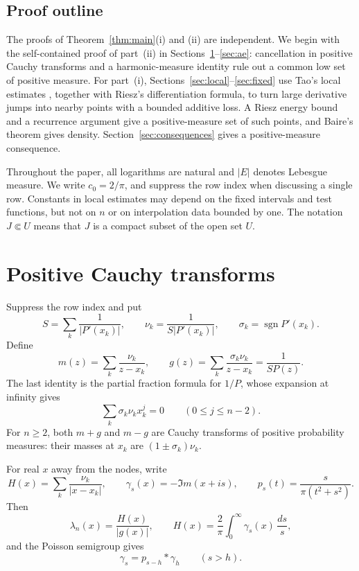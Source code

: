 \documentclass[11pt]{article}
\theoremstyle{remark}
\numberwithin{equation}{section}
\begin{document}
\subsection{Proof outline}

The proofs of Theorem~\ref{thm:main}(i) and (ii) are independent.
We begin with the self-contained proof of part~(ii) in
Sections~\ref{sec:cauchy}--\ref{sec:ae}: cancellation in positive
Cauchy transforms and a harmonic-measure identity rule out a common
low set of positive measure.
For part~(i), Sections~\ref{sec:local}--\ref{sec:fixed} use Tao's local
estimates \cite[Theorem~4.1(ii)]{Tao}, together with Riesz's
differentiation formula, to turn large derivative jumps into nearby
points with a bounded additive loss.
A Riesz energy bound and a recurrence argument give a positive-measure
set of such points, and Baire's theorem gives density.
Section~\ref{sec:consequences} gives a positive-measure consequence.

Throughout the paper, all logarithms are natural and \(|E|\) denotes
Lebesgue measure. We write \(c_0=2/\pi\), and suppress the row index
when discussing a single row. Constants in local estimates may depend
on the fixed intervals and test functions, but not on \(n\) or on
interpolation data bounded by one. The notation \(J\Subset U\) means
that \(J\) is a compact subset of the open set \(U\).

\section{Positive Cauchy transforms}\label{sec:cauchy}

Suppress the row index and put
\[
 S=\sum_k\frac1{|P'(x_k)|},\qquad
 \nu_k=\frac1{S|P'(x_k)|},\qquad
 \sigma_k=\operatorname{sgn}P'(x_k).
\]
Define
\begin{equation}\label{eq:transforms}
 m(z)=\sum_k\frac{\nu_k}{z-x_k},\qquad
 g(z)=\sum_k\frac{\sigma_k\nu_k}{z-x_k}
     =\frac1{SP(z)}.
\end{equation}
The last identity is the partial fraction formula for \(1/P\), whose expansion
at infinity gives
\begin{equation}\label{eq:moments}
 \sum_k\sigma_k\nu_kx_k^j=0\qquad(0\le j\le n-2).
\end{equation}
For \(n\ge2\), both \(m+g\) and \(m-g\) are Cauchy transforms of positive
probability measures: their masses at \(x_k\) are \((1\pm\sigma_k)\nu_k\).

For real \(x\) away from the nodes, write
\[
 H(x)=\sum_k\frac{\nu_k}{|x-x_k|},\qquad
 \gamma_s(x)=-\Im m(x+is),\qquad
 p_s(t)=\frac{s}{\pi(t^2+s^2)}.
\]
Then
\begin{equation}\label{eq:lebesgue-transform}
 \lambda_n(x)=\frac{H(x)}{|g(x)|},\qquad
 H(x)=\frac2\pi\int_0^\infty\gamma_s(x)\,\frac{ds}{s},
\end{equation}
and the Poisson semigroup gives
\begin{equation}\label{eq:semigroup}
 \gamma_s=p_{s-h}*\gamma_h\qquad(s>h).
\end{equation}
\end{document}
